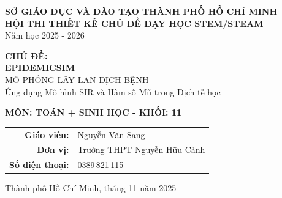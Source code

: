 \documentclass[12pt,a4paper]{article}
\begin{document}
\begin{titlepage}

\vspace{2cm}
\begin{center}
{\LARGE\bfseries\color{primary}\sffamily SỞ GIÁO DỤC VÀ ĐÀO TẠO THÀNH PHỐ HỒ CHÍ MINH}\\
\vspace{0.5cm}
{\Large\bfseries\sffamily HỘI THI THIẾT KẾ CHỦ ĐỀ DẠY HỌC STEM/STEAM}\\
\vspace{0.3cm}
{\large\sffamily Năm học 2025 - 2026}

\vspace{2cm}

\begin{tcolorbox}[width=0.9\textwidth, colback=gray!5, colframe=primary, arc=2mm, boxrule=1pt]
    \centering
    {\LARGE\bfseries\sffamily CHỦ ĐỀ:} \\
    {\Huge\bfseries\color{danger}\sffamily EPIDEMICSIM}\\
    \vspace{0.25cm}
    {\Large\sffamily MÔ PHỎNG LÂY LAN DỊCH BỆNH}\\
    \vspace{0.25cm}
    {\large\sffamily Ứng dụng Mô hình SIR và Hàm số Mũ trong Dịch tễ học}
\end{tcolorbox}

\vspace{1.5cm}
{\Large\bfseries\sffamily MÔN: TOÁN + SINH HỌC - KHỐI: 11}

\vfill
\large
\begin{tabular}{rl}
\sffamily\bfseries Giáo viên: & Nguyễn Văn Sang\\
\sffamily\bfseries Đơn vị: & Trường THPT Nguyễn Hữu Cảnh\\
\sffamily\bfseries Số điện thoại: & 0389\,821\,115\\
\end{tabular}

\vspace{1cm}
{\large\sffamily Thành phố Hồ Chí Minh, tháng 11 năm 2025}
\end{center}
\end{titlepage}
\end{document}
